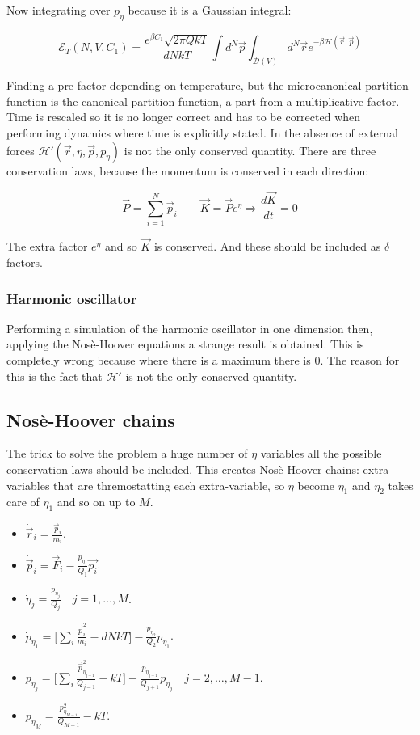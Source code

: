	Now integrating over $p_\eta$ because it is a Gaussian integral:

	$$\mathcal{E}_T(N, V, C_1) = \frac{e^{\beta C_1}\sqrt{2\pi Qk T}}{dNkT}\int d^N\vec{p}\int_{\mathcal{D}(V)}d^N\vec{r}e^{-\beta\mathcal{H}(\vec{r}, \vec{p})}$$

	Finding a pre-factor depending on temperature, but the microcanonical partition function is the canonical partition function, a part from a multiplicative factor.
	Time is rescaled so it is no longer correct and has to be corrected when performing dynamics where time is explicitly stated.
	In the absence of external forces $\mathcal{H}'(\vec{r}, \eta, \vec{p}, p_\eta)$ is not the only conserved quantity.
	There are three conservation laws, because the momentum is conserved in each direction:

	$$\vec{P} = \sum\limits_{i=1}^N\vec{p}_i\qquad \vec{K} = \vec{P}e^\eta\Rightarrow \frac{d\vec{K}}{d t} = 0$$

	The extra factor $e^\eta$ and so $\vec{K}$ is conserved.
	And these should be included as $\delta$ factors.

		\subsubsection{Harmonic oscillator}
		Performing a simulation of the harmonic oscillator in one dimension then, applying the Nos\`e-Hoover equations a strange result is obtained.
		This is completely wrong because where there is a maximum there is $0$.
		The reason for this is the fact that $\mathcal{H}'$ is not the only conserved quantity.

	\subsection{Nos\`e-Hoover chains}
	The trick to solve the problem a huge number of $\eta$ variables all the possible conservation laws should be included.
	This creates Nos\`e-Hoover chains: extra variables that are thremostatting each extra-variable, so $\eta$ become $\eta_1$ and $\eta_2$ takes care of $\eta_1$ and so on up to $M$.

	\begin{multicols}{2}
		\begin{itemize}
			\item $\dot{\vec{r}}_i = \frac{\vec{p}_i}{m_i}$.
			\item $\dot{\vec{p}}_i = \vec{F}_i - \frac{p_{\eta_1}}{Q_1}\vec{p_i}$.
			\item $\dot{\eta}_j = \frac{p_{\eta_j}}{Q_j}\quad j = 1, \dots, M$.
			\item $\dot{p}_{\eta_1} = \biggl[\sum\limits_i\frac{\vec{p}_i^2}{m_i}-dNkT\biggr] - \frac{p_{\eta_2}}{Q_2}p_{\eta_1}$.
			\item $\dot{p}_{\eta_j} = \biggl[\sum\limits_i\frac{\vec{p}_{\eta_{j-1}}^2}{Q_{j-1}}-kT\biggr] - \frac{p_{\eta_{j+1}}}{Q_{j+1}}p_{\eta_j}\quad j = 2, \dots, M-1$.
			\item $\dot{p}_{\eta_M} = \frac{p^2_{\eta_{M-1}}}{Q_{M-1}}-kT$.
		\end{itemize}
	\end{multicols}

